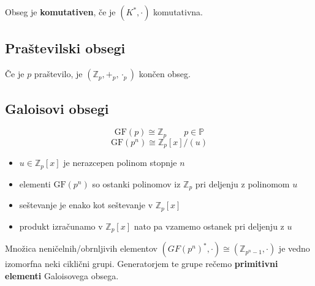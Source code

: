 \begin{multicols}{4}
Obseg je \textbf{komutativen}, če je $(K^*, \cdot)$ komutativna.

\subsection*{Praštevilski obsegi}
Če je $p$ praštevilo, je $(\mathbb{Z}_p, +_p, \cdot_p)$ končen obseg.


\subsection*{Galoisovi obsegi}
\[\text{GF}(p) \cong \mathbb{Z}_p \qquad p \in \mathbb{P}\]
\[ \text{GF}(p^n) \cong \mathbb{Z}_p[x]/(u) \]
\begin{itemize}
	\item $u \in \mathbb{Z}_p[x]$ je nerazcepen polinom stopnje $n$
	\item elementi $\text{GF}(p^n)$ so ostanki polinomov iz $\mathbb{Z}_p$ pri deljenju z polinomom $u$
	\item seštevanje je enako kot seštevanje v $\mathbb{Z}_p[x]$
	\item produkt izračunamo v $\mathbb{Z}_p[x]$ nato pa vzamemo ostanek pri deljenju z $u$
\end{itemize}

Množica neničelnih/obrnljivih elementov $(GF(p^n)^*, \cdot) \cong (\mathbb{Z}_{p^n-1}, \cdot)$ je vedno izomorfna neki ciklični grupi.
Generatorjem te grupe rečemo \textbf{primitivni elementi} Galoisovega obsega.

\end{multicols}

